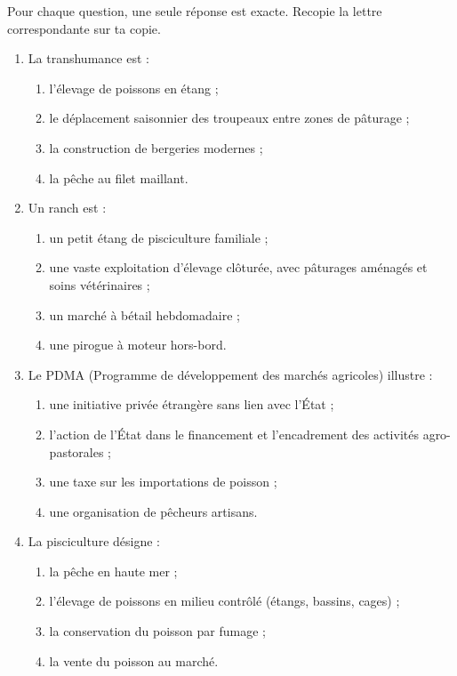 \documentclass[11pt]{article}
\newcommand{\cle}[1]{{\popxbold\color{popdark}#1}}
\begin{document}
\begin{exercice}
Pour chaque question, une seule réponse est exacte. Recopie la lettre correspondante sur ta copie.

\begin{enumerate}
\item La \cle{transhumance} est :
\begin{enumerate}
\item[a)] l'élevage de poissons en étang ;
\item[b)] le déplacement saisonnier des troupeaux entre zones de pâturage ;
\item[c)] la construction de bergeries modernes ;
\item[d)] la pêche au filet maillant.
\end{enumerate}
\item Un \cle{ranch} est :
\begin{enumerate}
\item[a)] un petit étang de pisciculture familiale ;
\item[b)] une vaste exploitation d'élevage clôturée, avec pâturages aménagés et soins vétérinaires ;
\item[c)] un marché à bétail hebdomadaire ;
\item[d)] une pirogue à moteur hors-bord.
\end{enumerate}
\item Le \cle{PDMA} (Programme de développement des marchés agricoles) illustre :
\begin{enumerate}
\item[a)] une initiative privée étrangère sans lien avec l'État ;
\item[b)] l'action de l'État dans le financement et l'encadrement des activités agro-pastorales ;
\item[c)] une taxe sur les importations de poisson ;
\item[d)] une organisation de pêcheurs artisans.
\end{enumerate}
\item La \cle{pisciculture} désigne :
\begin{enumerate}
\item[a)] la pêche en haute mer ;
\item[b)] l'élevage de poissons en milieu contrôlé (étangs, bassins, cages) ;
\item[c)] la conservation du poisson par fumage ;
\item[d)] la vente du poisson au marché.
\end{enumerate}
\end{enumerate}
\end{exercice}
\end{document}
